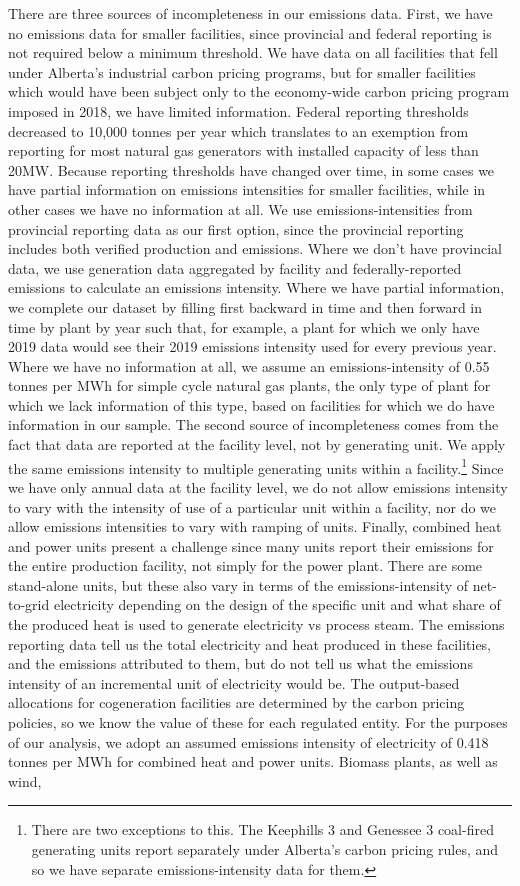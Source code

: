 \documentclass[12pt]{article}
\begin{document}
There are three sources of incompleteness in our emissions data. First, we have no emissions data for smaller facilities, since provincial and federal reporting is not required below a minimum threshold. We have data on all facilities that fell under Alberta's industrial carbon pricing programs, but for smaller facilities which would have been subject only to the economy-wide carbon pricing program imposed in 2018, we have limited information. Federal reporting thresholds decreased to 10,000 tonnes per year which translates to an exemption from reporting for most natural gas generators with installed capacity of less than 20MW. Because reporting thresholds have changed over time, in some cases we have partial information on emissions intensities for smaller facilities, while in other cases we have no information at all. We use emissions-intensities from provincial reporting data as our first option, since the provincial reporting includes both verified production and emissions. Where we don't have provincial data, we use generation data aggregated by facility and federally-reported emissions to calculate an emissions intensity. Where we have partial information, we complete our dataset by filling first backward in time and then forward in time by plant by year such that, for example, a plant for which we only have 2019 data would see their 2019 emissions intensity used for every previous year. Where we have no information at all, we assume an emissions-intensity of 0.55 tonnes per MWh for simple cycle natural gas plants, the only type of plant for which we lack information of this type, based on facilities for which we do have information in our sample. The second source of incompleteness comes from the fact that data are reported at the facility level, not by generating unit. We apply the same emissions intensity to multiple generating units within a facility.\footnote{There are two exceptions to this. The Keephills 3 and Genessee 3 coal-fired generating units report separately under Alberta's carbon pricing rules, and so we have separate emissions-intensity data for them.} Since we have only annual data at the facility level, we do not allow emissions intensity to vary with the intensity of use of a particular unit within a facility, nor do we allow emissions intensities to vary with ramping of units. Finally, combined heat and power units present a challenge since many units report their emissions for the entire production facility, not simply for the power plant. There are some stand-alone units, but these also vary in terms of the emissions-intensity of net-to-grid electricity depending on the design of the specific unit and what share of the produced heat is used to generate electricity vs process steam. The emissions reporting data tell us the total electricity and heat produced in these facilities, and the emissions attributed to them, but do not tell us what the emissions intensity of an incremental unit of electricity would be. The output-based allocations for cogeneration facilities are determined by the carbon pricing policies, so we know the value of these for each regulated entity. For the purposes of our analysis, we adopt an assumed emissions intensity of electricity of 0.418 tonnes per MWh for combined heat and power units. Biomass plants, as well as wind, 
\end{document}
